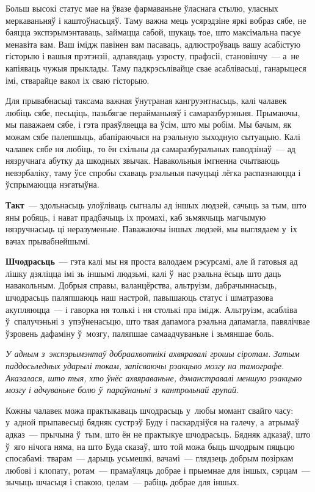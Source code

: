 Больш высокі статус мае на ўвазе фармаваньне ўласнага стылю, уласных меркаваньняў і каштоўнасьцяў. Таму важна мець усярэдзіне яркі вобраз сябе, не баяцца экспэрымэнтаваць, займацца сабой, шукаць тое, што максімальна пасуе менавіта вам. Ваш імідж павінен вам пасаваць, адлюстроўваць вашу асабістую гісторыю і вашыя прэтэнзіі, адпавядаць узросту, прафэсіі, становішчу~--- а~не капіяваць чужыя прыклады. Таму падкрэсьлівайце свае асаблівасьці, ганарыцеся імі, стварайце вакол іх сваю гісторыю.

Для прывабнасьці таксама важная ўнутраная кангруэнтнасьць, калі чалавек любіць сябе, песьціць, пазьбягае перайманьняў і самаразбурэньня. Прымаючы, мы паважаем сябе, і гэта праяўляецца ва ўсім, што мы робім. Мы бачым, як можам сябе палепшыць, абапіраючыся на рэальную зыходную сытуацыю. Калі чалавек сябе ня любіць, то ён схільны да самаразбуральных паводзінаў~--- ад нязручнага абутку да шкодных звычак. Навакольныя імгненна счытваюць невэрбаліку, таму ўсе спробы схаваць рэальныя пачуцьці лёгка распазнаюцца і ўспрымаюцца нэгатыўна.

\textbf{Такт}~--- здольнасьць улоўліваць сыгналы ад іншых людзей, сачыць за тым, што яны робяць, і нават прадбачыць іх промахі, каб зьмякчыць магчымую нязручнасьць ці неразуменьне. Паважаючы іншых людзей, мы выглядаем у~іх вачах прывабнейшымі.

\textbf{Шчодрасьць}~--- гэта калі мы ня проста валодаем рэсурсамі, але й гатовыя ад лішку дзяліцца імі зь іншымі людзьмі, калі ў~нас рэальна ёсьць што даць навакольным. Добрыя справы, валанцёрства, альтруізм, дабрачыннасьць, шчодрасьць паляпшаюць наш настрой, павышаюць статус і шматразова акупляюцца~--- і гаворка ня толькі і ня столькі пра імідж. Альтруізм, асабліва ў~спалучэньні з~упэўненасьцю, што твая дапамога рэальна дапамагла, павялічвае ўзровень дафаміну ў~мозгу, паляпшае самаадчуваньне і зьмяншае боль.

\emph{У адным з~экспэрымэнтаў добраахвотнікі ахвяравалі грошы сіротам. Затым паддосьледных ударылі токам, запісваючы рэакцыю мозгу на тамографе. Аказалася, што тыя, хто ўнёс ахвяраваньне, дэманстравалі меншую рэакцыю мозгу і адчуваньне болю ў~параўнаньні з~кантрольнай групай.}

Кожны чалавек можа практыкаваць шчодрасьць у~любы момант свайго часу: у~адной прыпавесьці бядняк сустрэў Буду і паскардзіўся на галечу, а~атрымаў адказ~--- прычына ў~тым, што ён не практыкуе шчодрасьць. Бядняк адказаў, што ў~яго нічога няма, на што Буда сказаў, што той можа быць шчодрым пяцьцю спосабамі: тварам~--- дарыць усьмешкі, вачамі~--- глядзець добрым позіркам любові і клопату, ротам~--- прамаўляць добрае і прыемнае для іншых, сэрцам~--- зычыць шчасьця і спакою, целам~--- рабіць добрае для іншых.

